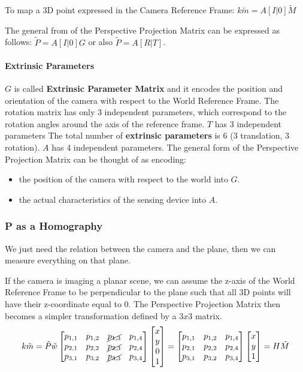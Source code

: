 \documentclass{article}
\begin{document}
To map a 3D point expressed in the Camera Reference Frame: $k\tilde{m} = A[I|0]\tilde{M}$

The general from of the Perspective Projection Matrix can be expressed as follows:
$\tilde{P} = A[I|0]G$ or also $\tilde{P}=A[R|T]$.

\paragraph{Extrinsic Parameters}

$G$ is called \textbf{Extrinsic Parameter Matrix} and it encodes the position and orientation of the camera with respect to the World Reference Frame.
The rotation matrix has only 3 independent parameters, which correspond to the rotation angles around the axis of the reference frame.
$T$ has 3 independent parameters
The total number of \textbf{extrinsic parameters} is 6 (3 translation, 3 rotation).
$A$ has 4 independent parameters.
The general form of the Perspective Projection Matrix can be thought of as encoding:
\begin{itemize}
  \item the position of the camera with respect to the world into $G$.
  \item the actual characteristics of the sensing device into $A$.
\end{itemize}

\subsubsection{P as a Homography}
We just need the relation between the camera and the plane, then we can measure everything on that plane.

If the camera is imaging a planar scene, we can assume the z-axis of the World Reference Frame to be perpendicular to the plane such that all 3D points will have their z-coordinate equal to 0.
The Perspective Projection Matrix then becomes a simpler transformation defined by a $3x3$ matrix.
$$k\tilde{m} = \tilde{P}\tilde{w}
\begin{bmatrix}
  p_{1,1} & p_{1,2} & \cancel{p_{1,3}} & p_{1,4} \\
  p_{2,1} & p_{2,2} & \cancel{p_{2,3}} & p_{2,4} \\
  p_{3,1} & p_{3,2} & \cancel{p_{3,3}} & p_{3,4} 
\end{bmatrix}
\begin{bmatrix}
x \\ y \\ 0 \\ 1
\end{bmatrix}
=
\begin{bmatrix}
  p_{1,1} & p_{1,2} & p_{1,4} \\
  p_{2,1} & p_{2,2} & p_{2,4} \\
  p_{3,1} & p_{3,2} & p_{3,4} 
\end{bmatrix}
\begin{bmatrix}
x \\ y \\ 1
\end{bmatrix}
= H\tilde{M}
$$
\end{document}
